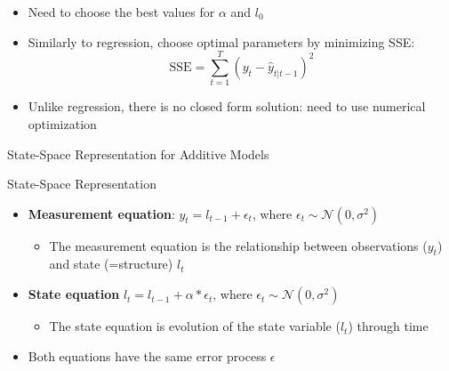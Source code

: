 \documentclass{beamer}
\begin{document}
\begin{frame}
  \begin{itemize}
  \item Need to choose the best values for $\alpha$ and $l_0$
  \item Similarly to regression, choose optimal parameters by minimizing SSE:
    \begin{equation*}
      \text{SSE} = \sum_{t=1}^T (y_t - \hat{y}_{t|t-1})^2
    \end{equation*}
  \item Unlike regression, there is no closed form solution: need to use numerical optimization
  \end{itemize}
\end{frame}


\begin{frame}{State-Space Representation for Additive Models}
  \begin{block}{State-Space Representation}
    \begin{itemize}
    \item \textbf{Measurement equation}: $y_t = l_{t-1} + \epsilon_t$, where $\epsilon_t \sim \mathcal{N}(0, \sigma^2)$
      \begin{itemize}
      \item The measurement equation is the relationship between observations ($y_t$) and state (=structure) $l_t$
      \end{itemize}
    \item \textbf{State equation} $l_t = l_{t-1} + \alpha*\epsilon_t$, where $\epsilon_t \sim \mathcal{N}(0, \sigma^2)$
      \begin{itemize}
      \item The state equation is evolution of the state variable ($l_t$) through time
      \end{itemize}
     \end{itemize}
  \end{block}


  \begin{itemize}
  \item Both equations have the same error process $\epsilon$
  \end{itemize}
  
\end{frame}
\end{document}
